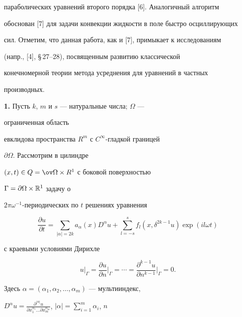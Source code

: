параболических уравнений второго порядка [6]. Аналогичный алгоритм 


обоснован [7] для задачи конвекции жидкости в поле быстро осциллирующих 


сил. Отметим, что данная работа, как и [7], примыкает к исследованиям 


(напр., [4], \S\,27--28), посвященным развитию классической 


конечномерной теории метода усреднения для уравнений в частных 


производных.  


\medskip 


 


{\bf 1.} Пусть $k$, $m$ и $s$ --- натуральные числа; $\Omega$ --- 


ограниченная область  


евклидова пространства $R^m$ с $C^\infty$-гладкой границей 


$\partial\Omega$. Рассмотрим в цилиндре 


$(x,t)\in Q=\ov\Omega\times R^1$ с боковой поверхностью


$\Gamma=\partial\Omega\times\Bbb R^1$ задачу о 


$2\pi\omega^{-1}$-периодических по $t$ решениях уравнения 


\begin{equation} 


\frac{\partial u}{\partial t}=\sum_{|\alpha|=2k}a_\alpha(x) 


D^\alpha u+\sum^s_{l=-s}f_l(x,\delta^{2k-1}u)\exp(i l\omega t) 


\end{equation} 


с краевыми условиями Дирихле 


\begin{equation} 


u|_{\Gamma}=\frac{\partial u}{\partial n}\bigg|_{\Gamma} 


=\dotsb=\frac{\partial^{k-1}u}{\partial n^{k-1}} 


\bigg|_{\Gamma}=0. 


\end{equation} 


Здесь $\alpha=(\alpha_1,\alpha_2,\dotsc,\alpha_m)$ --- мультииндекс, 


$D^\alpha u=\frac{\partial^{|\alpha|}u}{\partial x^{\alpha_1}_1 \dotsc 


\partial x^{\alpha_m}_m}$, $|\alpha|=\sum\limits^m_{i=1}\alpha_i$, $n$ 


